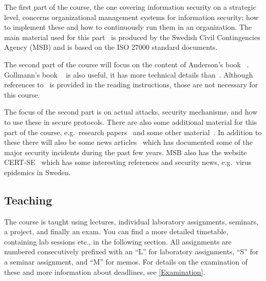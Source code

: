 \documentclass[a4paper]{llncs}
\begin{document}
The first part of the course, the one covering information security on 
a strategic level, concerns organizational management systems for information 
security; how to implement these and how to continuously run them in an 
organization.
The main material used for this part~\cite{%
  MSB2011itm,MSB2011sle,MSB2011p,%
	MSB2011v,MSB2011r,MSB2011gap,MSB2011gb,%
	MSB2011vs,MSB2011us,MSB2011upo,%
	MSB2011pg,MSB2011koa,MSB2011i,%
	MSB2011o,MSB2011g,MSB2011lg,%
	MSB2011ulo,MSB2011kf,MSB2011fa%
} is produced by the Swedish Civil Contingencies Agency (MSB) and is based on 
the ISO 27000 standard documents.

The second part of the course will focus on the content of Anderson's book 
~\cite{Anderson2008sea}.
Gollmann's book ~\cite{Gollmann2011cs} is also 
useful, it has more technical details than~\cite{Anderson2008sea}.
Although references to~\cite{Gollmann2011cs} is provided in the reading 
instructions, those are not necessary for this course.

The focus of the second part is on actual attacks, security mechanisms, and how 
to use these in secure protocols.
There are also some additional material for this part of the course, 
e.g.~research papers~\cite{%
  Juels2012sha,%
  Komanduri2011opa%
} and some other material~\cite{Bosk2013gl,Bosk2013itn}.
In addition to these there will also be some news articles~\cite{%
  Honan2012haa,%
  Zetter2012hnt,%
  Fisher2011rsa,%
  Hunt2011abs,%
  Cluley2012twp,%
  Oberheide2010bao,%
  Cubrilovic2009rhf%
} which has documented some of the major security incidents during the past few 
years.
MSB also has the website CERT-SE~\cite{CERT-SE} which has some interesting 
references and security news, e.g.~virus epidemics in Sweden.

\subsection{Teaching}

The course is taught using lectures, individual laboratory assignments, 
seminars, a project, and finally an exam.
You can find a more detailed timetable, containing lab sessions etc., in the 
following section.
All assignments are numbered consecutively prefixed with an \enquote{L} for 
laboratory assignments, \enquote{S} for a seminar assignment, and \enquote{M} 
for memos.
For details on the examination of these and more information about deadlines, 
see \cref{Examination}.
\end{document}
